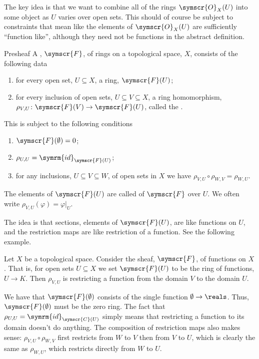 \documentclass[fleqn]{NotesClass}
\newcommand{\sheaf}[1]{\symscr{#1}}
\newcommand{\id}{\symrm{id}}
\begin{document}
    The key idea is that we want to combine all of the rings \(\sheaf{O}_X(U)\) into some object as \(U\) varies over open sets.
    This should of course be subject to constraints that mean like the elements of \(\sheaf{O}_X(U)\) are sufficiently \enquote{function like}, although they need not be functions in the abstract definition.
    
    \begin{dfn}{Presheaf}{}
        A , \(\sheaf{F}\), of rings on a topological space, \(X\), consists of the following data
        \begin{enumerate}
            \item for every open set, \(U \subseteq X\), a ring, \(\sheaf{F}(U)\);
            \item for every inclusion of open sets, \(U \subseteq V \subseteq X\), a ring homomorphism, \(\rho_{V,U} \colon \sheaf{F}(V) \to \sheaf{F}(U)\), called the .
        \end{enumerate}
        This is subject to the following conditions
        \begin{enumerate}
            \item \(\sheaf{F}(\emptyset) = 0\);
            \item \(\rho_{U,U} = \id_{\sheaf{F}(U)}\);
            \item for any inclusions, \(U \subseteq V \subseteq W\), of open sets in \(X\) we have \(\rho_{V,U} \circ \rho_{W,V} = \rho_{W,U}\).
        \end{enumerate}
        The elements of \(\sheaf{F}(U)\) are called  of \(\sheaf{F}\) over \(U\).
        We often write \(\rho_{V,U}(\varphi) = \varphi|_U\).
    \end{dfn}
    
    The idea is that sections, elements of \(\sheaf{F}(U)\), are like functions on \(U\), and the restriction maps are like restriction of a function.
    See the following example.
    
    \begin{exm}{}{}
        Let \(X\) be a topological space.
        Consider the sheaf, \(\sheaf{F}\), of functions on \(X\).
        That is, for open sets \(U \subseteq X\) we set \(\sheaf{F}(U)\) to be the ring of functions, \(U \to K\).
        Then \(\rho_{V,U}\) is restricting a function from the domain \(V\) to the domain \(U\).
        
        We have that \(\sheaf{F}(\emptyset)\) consists of the single function \(\emptyset \to \reals\).
        Thus, \(\sheaf{F}(\emptyset)\) must be the zero ring.
        The fact that \(\rho_{U,U} = \id_{\sheaf{C}(U)}\) simply means that restricting a function to its domain doesn't do anything.
        The composition of restriction maps also makes sense: \(\rho_{V,U} \circ \rho_{W,V}\) first restricts from \(W\) to \(V\) then from \(V\) to \(U\), which is clearly the same as \(\rho_{W,U}\), which restricts directly from \(W\) to \(U\).
    \end{exm}
    
\end{document}
